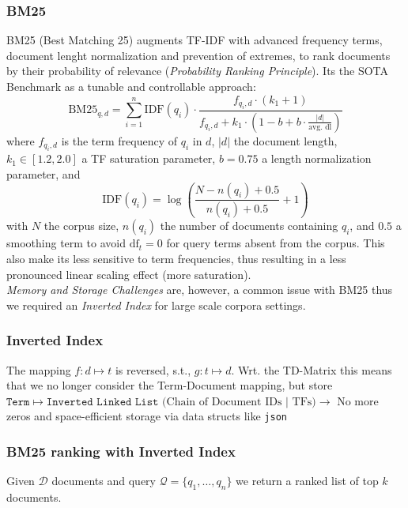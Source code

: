 \documentclass{article}
\begin{document}
\subsubsection{BM25}
BM25 (Best Matching 25) augments TF-IDF with advanced frequency terms, document lenght normalization and prevention of extremes, to rank documents by their probability of relevance (\textit{Probability Ranking Principle}). Its the SOTA Benchmark as a tunable and controllable approach:
$$
\text{BM25}_{q,d} = \sum_{i=1}^{n} \text{IDF}(q_i) \cdot \frac{f_{q_i,d} \cdot (k_1 + 1)}{f_{q_i,d} + k_1 \cdot \left(1 - b + b \cdot \frac{|d|}{\text{avg. dl}}\right)}
$$
where $f_{q_i,d}$ is the term frequency of $q_i$ in $d$, $|d|$ the document length, $k_1\in[1.2,2.0]$ a TF saturation parameter, $b=0.75$ a length normalization parameter, and
$$
\text{IDF}(q_i) = \log\left(\frac{N - n(q_i) + 0.5}{n(q_i) + 0.5} + 1\right)
$$
with $N$ the corpus size, $n(q_i)$ the number of documents containing $q_i$, and $0.5$ a smoothing term to avoid $\text{df}_t = 0$ for query terms absent from the corpus. This also make its less sensitive to term frequencies, thus resulting in a less pronounced linear scaling effect (more saturation).\\

\textit{Memory and Storage Challenges} are, however, a common issue with BM25 thus we required an \textit{Inverted Index} for large scale corpora settings.

\subsubsection{Inverted Index}
The mapping $f:d\mapsto t$ is reversed, s.t., $g:t\mapsto d$. Wrt. the TD-Matrix this means that we no longer consider the Term-Document mapping, but store $\texttt{Term}\mapsto\texttt{Inverted Linked List} \text{ (Chain of Document IDs | TFs)} \rightarrow$ No more zeros and space-efficient storage via data structs like \texttt{json}

\subsubsection{BM25 ranking with Inverted Index}
Given $\mathcal{D}$ documents and query $\mathcal{Q}=\{q_1, \dots, q_n\}$ we return a ranked list of top $k$ documents.\\
\end{document}
